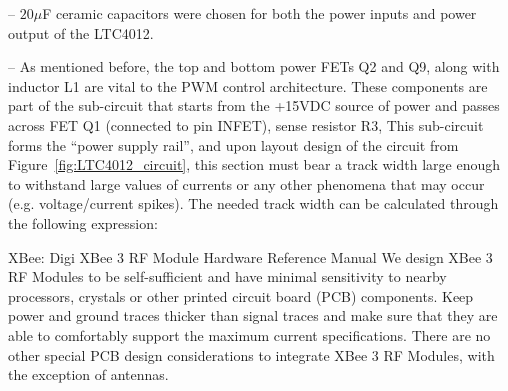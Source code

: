 



-- $20 \mu$F ceramic capacitors were chosen for both the power inputs and power output of the LTC4012. 

-- As mentioned before, the top and bottom power FETs Q2 and Q9, along with inductor L1 are vital to the PWM control architecture. These components are part of the sub-circuit that starts from the +15VDC source of power and passes across FET Q1 (connected to pin INFET), sense resistor R3, 
This sub-circuit forms the ``power supply rail'', and upon layout design of the circuit from Figure~\ref{fig:LTC4012_circuit}, this section must bear a track width large enough to withstand large values of currents or any other phenomena that may occur (e.g. voltage/current spikes). The needed track width can be calculated through the following expression:

XBee: Digi XBee 3 RF Module Hardware Reference Manual
We design XBee 3 RF Modules to be self-sufficient and have minimal sensitivity to nearby processors,
crystals or other printed circuit board (PCB) components. Keep power and ground traces thicker than
signal traces and make sure that they are able to comfortably support the maximum current
specifications. There are no other special PCB design considerations to integrate XBee 3 RF Modules,
with the exception of antennas.

